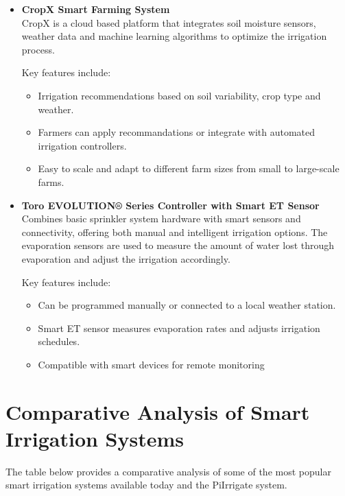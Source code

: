 \begin{itemize}
\begin{itemize}
    \item \textbf{CropX Smart Farming System} \\
    CropX is a cloud based platform that integrates soil moisture sensors, weather data and
    machine learning algorithms to optimize the irrigation process.

    Key features include:
    \begin{itemize}
      \item Irrigation recommendations based on soil variability, crop type and weather.
      \item Farmers can apply recommandations or integrate with automated irrigation controllers.
      \item Easy to scale and adapt to different farm sizes from small to large-scale farms.
    \end{itemize}
  
    \item \textbf{Toro EVOLUTION® Series Controller with Smart ET Sensor} \\
    Combines basic sprinkler system hardware with smart sensors and connectivity,
    offering both manual and intelligent irrigation options. The evaporation sensors are used to measure
    the amount of water lost through evaporation and adjust the irrigation accordingly.

    Key features include:
    \begin{itemize}
      \item Can be programmed manually or connected to a local weather station.
      \item Smart ET sensor measures evaporation rates and adjusts irrigation schedules.
      \item Compatible with smart devices for remote monitoring
    \end{itemize}
  \end{itemize}
\end{itemize}

\section{Comparative Analysis of Smart Irrigation Systems}
The table below provides a comparative analysis of some of the most popular smart 
irrigation systems available today and the PiIrrigate system.

